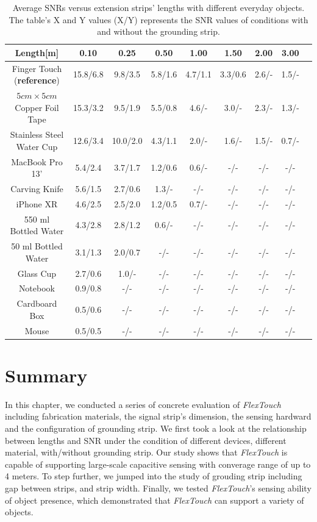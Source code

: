 \begin{table}[ht]
\caption{Average SNRs versus extension strips' lengths with different everyday objects. The table's X and  Y values (X/Y) represents the SNR values of conditions with and without the grounding strip. }
\vspace{-2mm}
	\centering
		\begin{tabular}{|c|c|c|c|c|c|c|c|c|}
		\hline
		\textbf{Length[m]} & \textbf{0.10} & \textbf{0.25} & \textbf{0.50} & \textbf{1.00} & \textbf{1.50} & \textbf{2.00} & \textbf{3.00} \\
		\hline
		Finger Touch (\textbf{reference}) & 15.8/6.8 & 9.8/3.5 & 5.8/1.6 & 4.7/1.1 & 3.3/0.6 & 2.6/- & 1.5/-  \\\hline
		$5 cm\times 5 cm$ Copper Foil Tape & 15.3/3.2 & 9.5/1.9 & 5.5/0.8 & 4.6/- & 3.0/- & 2.3/- & 1.3/-  \\\hline
		Stainless Steel Water Cup &  12.6/3.4 & 10.0/2.0 & 4.3/1.1 & 2.0/- & 1.6/- & 1.5/- & 0.7/-  \\\hline
		MacBook Pro 13' &  5.4/2.4 & 3.7/1.7 & 1.2/0.6 & 0.6/- & -/- & -/- & -/- \\\hline
		Carving Knife  & 5.6/1.5 & 2.7/0.6 & 1.3/- & -/- & -/- & -/- & -/-  \\\hline
		iPhone XR  & 4.6/2.5 & 2.5/2.0 & 1.2/0.5 & 0.7/- & -/- & -/- & -/- \\\hline
		550 ml Bottled Water  &  4.3/2.8 & 2.8/1.2 & 0.6/- & -/- & -/- & -/- & -/- \\\hline
		50 ml Bottled Water  &  3.1/1.3 & 2.0/0.7 &  -/- & -/- & -/- & -/- & -/- \\\hline
		Glass Cup &  2.7/0.6 & 1.0/- & -/- & -/- & -/- & -/- & -/-  \\\hline
		Notebook & 0.9/0.8 & -/- & -/- & -/- & -/- & -/- & -/-   \\\hline
		Cardboard Box  & 0.5/0.6 & -/- & -/- & -/- & -/- & -/- & -/-  \\\hline
		Mouse & 0.5/0.5 & -/- & -/- & -/- & -/- & -/- & -/- \\\hline
		\end{tabular}
		
		\label{tab:snrtableforobj}
		
\end{table}

\section{Summary}
In this chapter, we conducted a series of concrete evaluation of \textit{FlexTouch} including fabrication materials, the signal strip's dimension, the sensing hardward and the configuration of grounding strip. We first took a look at the relationship between lengths and SNR under the condition of different devices, different material, with/without grounding strip. Our study shows that \textit{FlexTouch} is capable of supporting large-scale capacitive sensing with converage range of up to 4 meters. To step further, we jumped into the study of grouding strip including gap between strips, and strip width. Finally, we tested \textit{FlexTouch}'s sensing ability of object presence, which demonstrated that \textit{FlexTouch} can support a variety of objects.